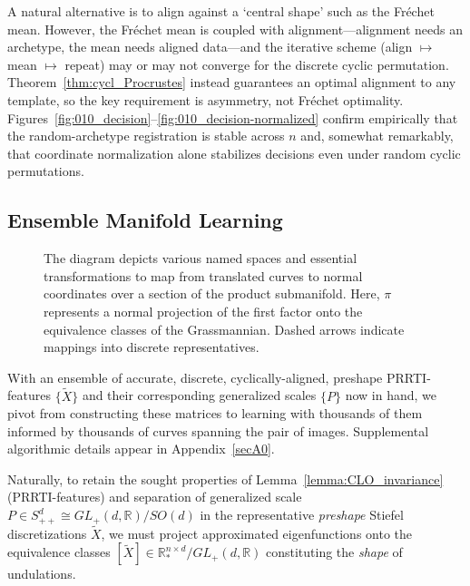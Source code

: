 \documentclass[pdflatex,iicol]{sn-jnl}%
\theoremstyle{thmstyleone}%
\theoremstyle{thmstyletwo}%
\theoremstyle{thmstylethree}%
\begin{document}
A natural alternative is to align against a `central shape' such as the Fr\'echet mean. However, the Fr\'echet mean is coupled with alignment---alignment needs an archetype, the mean needs aligned data---and the iterative scheme (align $\mapsto$ mean $\mapsto$ repeat) may or may not converge for the discrete cyclic permutation. Theorem~\ref{thm:cycl_Procrustes} instead guarantees an optimal alignment to any template, so the key requirement is asymmetry, not Fr\'echet optimality. Figures~\ref{fig:010_decision}--\ref{fig:010_decision-normalized} confirm empirically that the random-archetype registration is stable across $n$ and, somewhat remarkably, that coordinate normalization alone stabilizes decisions even under random cyclic permutations.


\subsection{Ensemble Manifold Learning} \label{subsec:mfld_learn}
\begin{figure}
    \centering
    
    \caption{The diagram depicts various named spaces and essential transformations to map from translated curves to normal coordinates over a section of the product submanifold. Here, $\pi$ represents a normal projection of the first factor onto the equivalence classes of the Grassmannian. Dashed arrows indicate mappings into discrete representatives.}
    \label{fig:placeholder}
\end{figure}
With an ensemble of accurate, discrete, cyclically-aligned, preshape PRRTI-features $\lbrace \widetilde{X}\rbrace$ and their corresponding generalized scales $\lbrace P\rbrace$ now in hand, we pivot from constructing these matrices to learning with thousands of them informed by thousands of curves spanning the pair of images. Supplemental algorithmic details appear in Appendix~\ref{secA0}.

Naturally, to retain the sought properties of Lemma~\ref{lemma:CLO_invariance} (PRRTI-features) and separation of generalized scale $P \in S^d_{++} \cong GL_+(d, \mathbb{R})/SO(d)$ in the representative \textit{preshape} Stiefel discretizations $\widetilde{X}$, we must project approximated eigenfunctions onto the equivalence classes $[\widetilde{X}] \in \mathbb{R}^{n \times d}_*/GL_+(d, \mathbb{R})$ constituting the \textit{shape} of undulations. 
\end{document}
